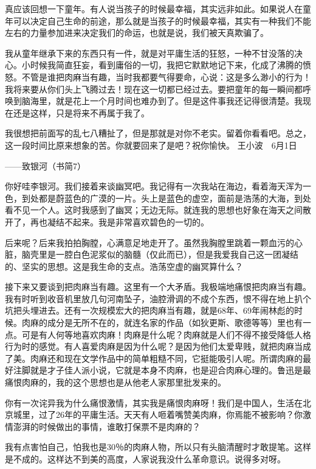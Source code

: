 真应该回想一下童年。有人说当孩子的时候最幸福，其实远非如此。如果说人在童年可以决定自己生命的前途，那么就是当孩子的时候最幸福，其实有一种我们不能左右的力量参加进来决定我们的命运，也就是说，我们被天真欺骗了。 

我从童年继承下来的东西只有一件，就是对平庸生活的狂怒，一种不甘没落的决心。小时候我简直狂妄，看到庸俗的一切，我把它默默地记下来，化成了沸腾的愤怒。不管是谁把肉麻当有趣，当时我都要气得要命，心说：这是多么渺小的行为！我将来要从你们头上飞腾过去！现在这一切都已经过去。要把童年的每一瞬间都呼唤到脑海里，就是花上一个月时间也难办到了。但是这件事我还记得很清楚。我现在还是这样，只是将来不再属于我了。 

我很想把前面写的乱七八糟扯了，但是那就是对你不老实。留着你看看吧。总之，这一段时间比原来想象的苦。你就要回来了是吧？祝你愉快。 王小波　6月1日 







——致银河（书简7） 

你好哇李银河。我们接着来谈幽冥吧。我记得有一次我站在海边，看着海天浑为一色，到处都是蔚蓝色的广漠的一片。头上是蓝色的虚空，面前是浩荡的大海，到处看不见一个人。这时我感到了幽冥；无边无际。就连我的思想也好象在海天之间散开了，再也凝结不起来。我是非常喜欢碧色的一切的。 

后来呢？后来我拍拍胸膛，心满意足地走开了。虽然我胸膛里跳着一颗血污的心脏，脑壳里是一腔白色泥浆似的脑髓（仅此而已），但是我爱我自己这一团凝结的、坚实的思想。这是我生命的支点。浩荡空虚的幽冥算什么？ 

接下来又要谈到把肉麻当有趣。这里有一个大矛盾。我极端地痛恨把肉麻当有趣。我有时听到收音机里放几句河南坠子，油腔滑调的不成个东西，恨不得在地上扒个坑把头埋进去。还有一次规模宏大的把肉麻当有趣，就是68年、69年闹林彪的时候。肉麻的成分是无所不在的，就连名家的作品（如狄更斯、歌德等等）里也有一点。可是有人何等地喜欢肉麻！肉麻是什么呢？肉麻就是人们不得不接受降低人格行为时的感觉。有人喜爱肉麻是因为什么呢？是因为他们太爱卑贱，就把肉麻当成了美。肉麻还和现在文学作品中的简单粗糙不同，它挺能吸引人呢。所谓肉麻的最好注脚就是才子佳人派小说，它就是本身不肉麻，也是迎合肉麻心理的。鲁迅是最痛恨肉麻的，我的这个思想也是从他老人家那里批发来的。 

你有一次诧异我为什么痛恨激情，其实我是痛恨肉麻呀！我们是中国人，生活在北京城里，过了26年的平庸生活。天天有人咂着嘴赞美肉麻，你焉能不被影响？你激情澎湃的时候做出的事情，谁敢打保票不是肉麻的？ 

我有点害怕自己，怕我也是30％的肉麻人物，所以只有头脑清醒时才敢提笔。这样是不成的。这样达不到美的高度，人家说我没什么革命意识。说得多对呀。 

